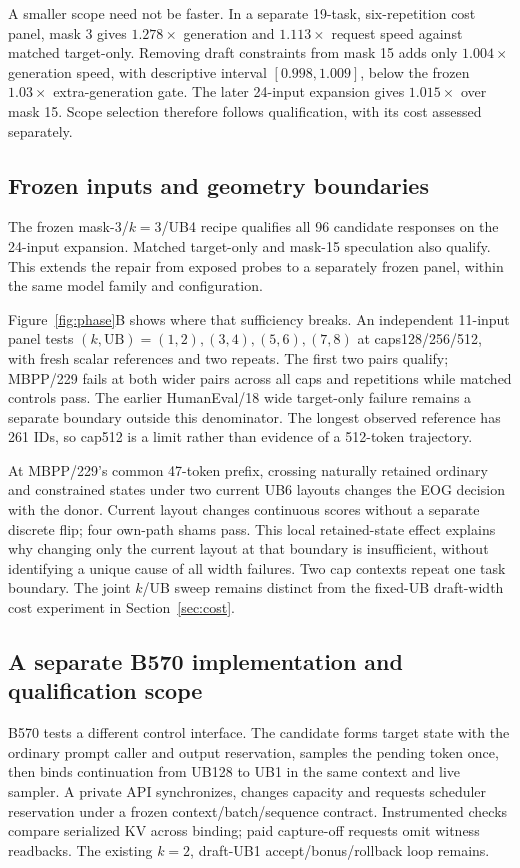 A smaller scope need not be faster. In a separate 19-task, six-repetition cost panel, mask 3 gives $1.278\times$ generation and $1.113\times$ request speed against matched target-only. Removing draft constraints from mask 15 adds only $1.004\times$ generation speed, with descriptive interval $[0.998,1.009]$, below the frozen $1.03\times$ extra-generation gate. The later 24-input expansion gives $1.015\times$ over mask 15. Scope selection therefore follows qualification, with its cost assessed separately.

\subsection{Frozen inputs and geometry boundaries}
The frozen mask-3/$k=3$/UB4 recipe qualifies all 96 candidate responses on the 24-input expansion. Matched target-only and mask-15 speculation also qualify. This extends the repair from exposed probes to a separately frozen panel, within the same model family and configuration.

Figure~\ref{fig:phase}B shows where that sufficiency breaks. An independent 11-input panel tests $(k,\mathrm{UB})=(1,2),(3,4),(5,6),(7,8)$ at caps128/256/512, with fresh scalar references and two repeats. The first two pairs qualify; MBPP/229 fails at both wider pairs across all caps and repetitions while matched controls pass. The earlier HumanEval/18 wide target-only failure remains a separate boundary outside this denominator. The longest observed reference has 261 IDs, so cap512 is a limit rather than evidence of a 512-token trajectory.

At MBPP/229's common 47-token prefix, crossing naturally retained ordinary and constrained states under two current UB6 layouts changes the EOG decision with the donor. Current layout changes continuous scores without a separate discrete flip; four own-path shams pass. This local retained-state effect explains why changing only the current layout at that boundary is insufficient, without identifying a unique cause of all width failures. Two cap contexts repeat one task boundary. The joint $k$/UB sweep remains distinct from the fixed-UB draft-width cost experiment in Section~\ref{sec:cost}.

\subsection{A separate B570 implementation and qualification scope}
B570 tests a different control interface. The candidate forms target state with the ordinary prompt caller and output reservation, samples the pending token once, then binds continuation from UB128 to UB1 in the same context and live sampler. A private API synchronizes, changes capacity and requests scheduler reservation under a frozen context/batch/sequence contract. Instrumented checks compare serialized KV across binding; paid capture-off requests omit witness readbacks. The existing $k=2$, draft-UB1 accept/bonus/rollback loop remains.

